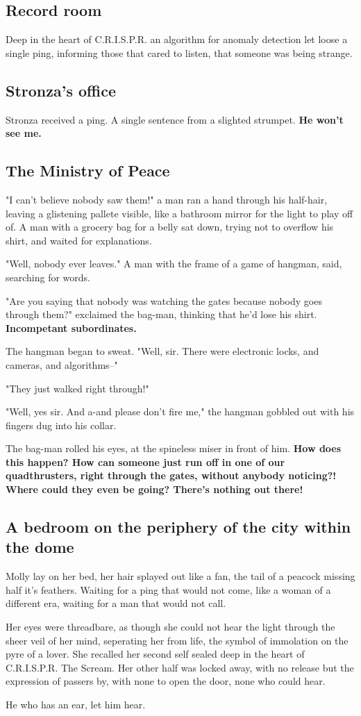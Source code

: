 \documentclass[12pt]{article}
\begin{document}
\subsection*{Record room}
\label{sec:orgb46a609}
Deep in the heart of C.R.I.S.P.R. an algorithm for anomaly detection let loose a single ping, informing those that cared to listen, that someone was being strange.
\subsection*{Stronza's office}
\label{sec:org4ef89a0}
Stronza received a ping. A single sentence from a slighted strumpet. \textbf{He won't see me.}
\subsection*{The Ministry of Peace}
\label{sec:org98ea0d5}
"I can't believe nobody saw them!" a man ran a hand through his half-hair, leaving a glistening pallete visible, like a bathroom mirror for the light to play off of. A man with a grocery bag for a belly sat down, trying not to overflow his shirt, and waited for explanations.

"Well, nobody ever leaves." A man with the frame of a game of hangman, said, searching for words.

"Are you saying that nobody was watching the gates because nobody goes through them?" exclaimed the bag-man, thinking that he'd lose his shirt. \textbf{Incompetant subordinates.}

The hangman began to sweat. "Well, sir. There were electronic locks, and cameras, and algorithms--"

"They just walked right through!"

"Well, yes sir. And a-and please don't fire me," the hangman gobbled out with his fingers dug into his collar.

The bag-man rolled his eyes, at the spineless miser in front of him. \textbf{How does this happen? How can someone just run off in one of our quadthrusters, right through the gates, without anybody noticing?! Where could they even be going? There's nothing out there!}
\subsection*{A bedroom on the periphery of the city within the dome}
\label{sec:orgbe7ea1c}
Molly lay on her bed, her hair splayed out like a fan, the tail of a peacock missing half it's feathers. Waiting for a ping that would not come, like a woman of a different era, waiting for a man that would not call.

Her eyes were threadbare, as though she could not hear the light through the sheer veil of her mind, seperating her from life, the symbol of immolation on the pyre of a lover. She recalled her second self sealed deep in the heart of C.R.I.S.P.R. The Scream. Her other half was locked away, with no release but the expression of passers by, with none to open the door, none who could hear.

He who has an ear, let him hear.
\end{document}
